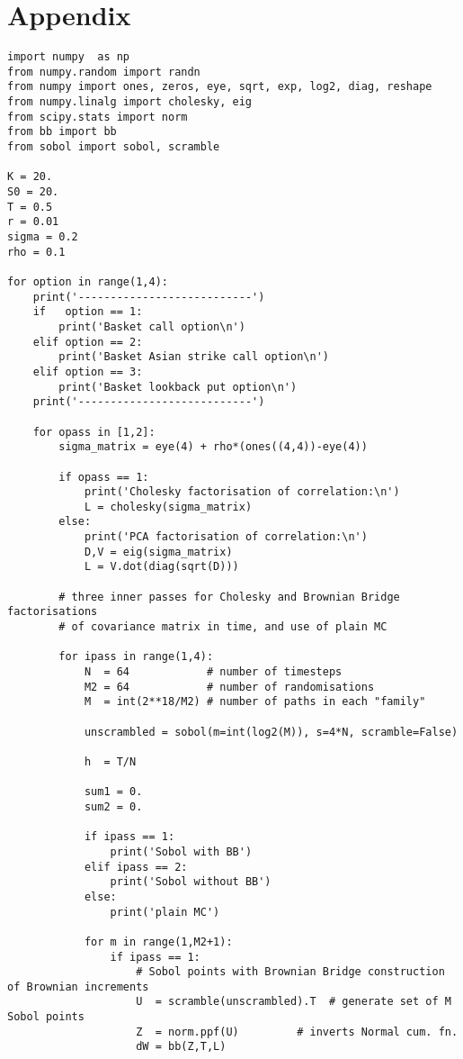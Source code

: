 \documentclass{article}
\begin{document}
\newpage
\section{Appendix}
\begin{lstlisting}
import numpy  as np
from numpy.random import randn
from numpy import ones, zeros, eye, sqrt, exp, log2, diag, reshape
from numpy.linalg import cholesky, eig
from scipy.stats import norm
from bb import bb
from sobol import sobol, scramble

K = 20.
S0 = 20.
T = 0.5
r = 0.01
sigma = 0.2
rho = 0.1

for option in range(1,4):
    print('---------------------------')
    if   option == 1:
        print('Basket call option\n')
    elif option == 2:
        print('Basket Asian strike call option\n')
    elif option == 3:
        print('Basket lookback put option\n')
    print('---------------------------')

    for opass in [1,2]:
    	sigma_matrix = eye(4) + rho*(ones((4,4))-eye(4))

        if opass == 1:
            print('Cholesky factorisation of correlation:\n')
            L = cholesky(sigma_matrix)
        else:
            print('PCA factorisation of correlation:\n')
            D,V = eig(sigma_matrix)
            L = V.dot(diag(sqrt(D)))

        # three inner passes for Cholesky and Brownian Bridge factorisations
        # of covariance matrix in time, and use of plain MC

        for ipass in range(1,4):
            N  = 64            # number of timesteps
            M2 = 64            # number of randomisations
            M  = int(2**18/M2) # number of paths in each "family"

            unscrambled = sobol(m=int(log2(M)), s=4*N, scramble=False)

            h  = T/N

            sum1 = 0.
            sum2 = 0.

            if ipass == 1:
                print('Sobol with BB')
            elif ipass == 2:
                print('Sobol without BB')
            else:
                print('plain MC')

            for m in range(1,M2+1):
                if ipass == 1:
                    # Sobol points with Brownian Bridge construction of Brownian increments
                    U  = scramble(unscrambled).T  # generate set of M Sobol points
                    Z  = norm.ppf(U)         # inverts Normal cum. fn.
                    dW = bb(Z,T,L)


\end{lstlisting}
\end{document}
